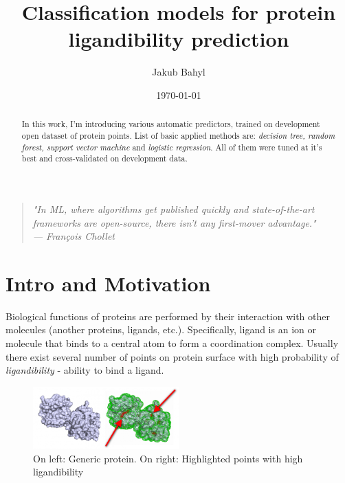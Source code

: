 \documentclass[%
 aip,
 jmp,%
 amsmath,amssymb,
 reprint,%
]{revtex4-1}
\begin{document}

\title[Introduction to Machine Learning - Project]{Classification models for protein ligandibility prediction}%

\author{Jakub Bahyl}
%

\date{\today}%

\begin{abstract}
In this work, I'm introducing various automatic predictors, trained on development open dataset of protein points. List of basic applied methods are: \textit{decision tree, random forest, support vector machine} and \textit{logistic regression}. All of them were tuned at it's best and cross-validated on development data.
\end{abstract}

\maketitle

\begin{quotation}
\textit{"In ML, where algorithms get published quickly and state-of-the-art frameworks are open-source, there isn't any first-mover advantage."\\
— François Chollet}
\end{quotation}



\section*{Intro and Motivation}

Biological functions of proteins are performed by their interaction with other molecules (another proteins, ligands, etc.). Specifically, ligand is an ion or molecule that binds to a central atom to form a coordination complex. Usually there exist several number of points on protein surface with high probability of \textit{ligandibility} - ability to bind a ligand.

\begin{figure}[h]
	\centering

	\includegraphics[width=0.5\textwidth]{graphics/proteins.png}

	\caption{On left: Generic protein. On right: Highlighted points with high ligandibility}
\end{figure}
\end{document}
